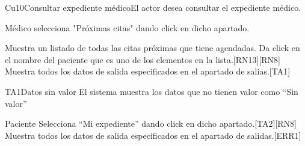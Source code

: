 \begin{UseCase}{Cu10}{Consultar expediente médico}{El actor desea consultar el expediente médico.}
{\begin{itemize}
\begin{itemize}
        \end{itemize}
        \end{itemize}
    }
    
\end{UseCase}

\begin{UCtrayectoria}{Médico}
        \UCpaso[\UCactor] selecciona "Próximas citas" dando click en dicho apartado.
        
        \UCpaso Muestra un listado de todas las citas próximas que tiene agendadas. 
        \UCpaso[\UCactor] Da click en el nombre del paciente que es uno de los elementos en la lista.[RN13][RN8]
        \UCpaso Muestra todos los datos de salida especificados en el apartado de salias.[TA1]
\end{UCtrayectoria}

\begin{UCtrayectoriaA}{TA1}{Datos sin valor}
    \UCpaso El sistema muestra los datos que no tienen valor como ``Sin valor''
    
\end{UCtrayectoriaA}

\begin{UCtrayectoria}{Paciente}
        \UCpaso[\UCactor] Selecciona ``Mi expediente'' dando click en dicho apartado.[TA2][RN8]
        \UCpaso Muestra todos los datos de salida especificados en el apartado de salidas.[ERR1]
\end{UCtrayectoria}
